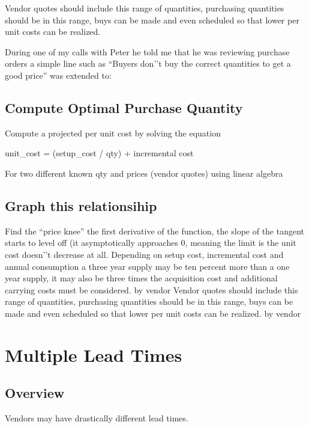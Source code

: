 \documentclass[letterpaper,10pt,english]{sphinxmanual}
\begin{document}
Vendor quotes should include this range of quantities, purchasing
quantities should be in this range, buys can be made and even scheduled
so that lower per unit costs can be realized.

During one of my calls with Peter he told me that he was reviewing
purchase orders a simple line such as “Buyers don’’t buy the correct
quantities to get a good price” was extended to:


\subsection{Compute Optimal Purchase Quantity}
\label{\detokenize{300-UnitCost:id1}}
Compute a projected per unit cost by solving the equation

unit\_cost = (setup\_cost / qty) + incremental cost

For two different known qty and prices (vendor quotes) using linear
algebra


\subsection{Graph this relationsihip}
\label{\detokenize{300-UnitCost:graph-this-relationsihip}}
Find the “price knee” the first derivative of the function, the slope of
the tangent starts to level off (it asymptotically approaches 0, meaning
the limit is the unit cost doesn’’t decrease at all. Depending on setup
cost, incremental cost and annual consumption a three year supply may be
ten percent more than a one year supply, it may also be three times the
acquisition cost and additional carrying costs must be considered.
by  vendor
Vendor quotes should include this range of quantities, purchasing
quantities should be in this range, buys can be made and even scheduled
so that lower per unit costs can be realized.
by  vendor


\section{Multiple Lead Times}
\label{\detokenize{400-MultipleLeadTimes:multiple-lead-times}}\label{\detokenize{400-MultipleLeadTimes::doc}}

\subsection{Overview}
\label{\detokenize{400-MultipleLeadTimes:overview}}
Vendors may have drastically different lead times.
\end{document}
